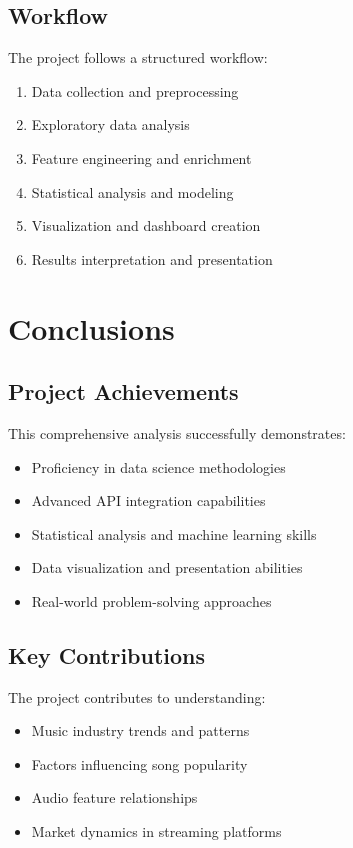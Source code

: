 \documentclass[12pt,a4paper]{article}
\begin{document}
\subsection{Workflow}
The project follows a structured workflow:
\begin{enumerate}
    \item Data collection and preprocessing
    \item Exploratory data analysis
    \item Feature engineering and enrichment
    \item Statistical analysis and modeling
    \item Visualization and dashboard creation
    \item Results interpretation and presentation
\end{enumerate}

\section{Conclusions}

\subsection{Project Achievements}
This comprehensive analysis successfully demonstrates:
\begin{itemize}
    \item Proficiency in data science methodologies
    \item Advanced API integration capabilities
    \item Statistical analysis and machine learning skills
    \item Data visualization and presentation abilities
    \item Real-world problem-solving approaches
\end{itemize}

\subsection{Key Contributions}
The project contributes to understanding:
\begin{itemize}
    \item Music industry trends and patterns
    \item Factors influencing song popularity
    \item Audio feature relationships
    \item Market dynamics in streaming platforms
\end{itemize}
\end{document}
